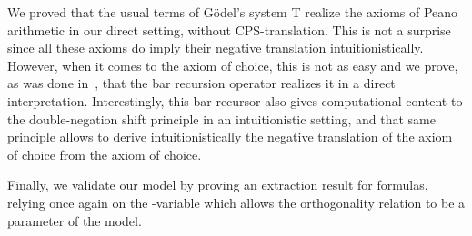\documentclass{CSML}
\begin{document}
We proved that the usual terms of G\"odel's system T realize the axioms of Peano arithmetic in our direct setting, without CPS-translation. This is not a surprise since all these axioms do imply their negative translation intuitionistically. However, when it comes to the axiom of choice, this is not as easy and we prove, as was done in~\cite{BlotRibaBarRec}, that the bar recursion operator realizes it in a direct interpretation. Interestingly, this bar recursor also gives computational content to the double-negation shift principle in an intuitionistic setting, and that same principle allows to derive intuitionistically the negative translation of the axiom of choice from the axiom of choice.\par
Finally, we validate our model by proving an extraction result for  formulas, relying once again on the -variable  which allows the orthogonality relation to be a parameter of the model.
\end{document}
